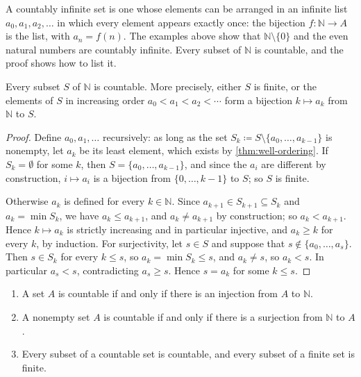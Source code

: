 A countably infinite set is one whose elements can be arranged in an infinite list $a_0,a_1,a_2,\ldots$ in which every element appears exactly once: the bijection $f\colon\mathbb N\to A$ is the list, with $a_n=f(n)$. The examples above show that $\mathbb N\setminus\{0\}$ and the even natural numbers are countably infinite. Every subset of $\mathbb N$ is countable, and the proof shows how to list it.

\begin{lemma}
\label{lem:subset-n}
Every subset $S$ of $\mathbb N$ is countable. More precisely, either $S$ is finite, or the elements of $S$ in increasing order $a_0<a_1<a_2<\cdots$ form a bijection $k\mapsto a_k$ from $\mathbb N$ to $S$.
\end{lemma}

\begin{proof}
Define $a_0,a_1,\ldots$ recursively: as long as the set $S_k\coloneqq S\setminus\{a_0,\ldots,a_{k-1}\}$ is nonempty, let $a_k$ be its least element, which exists by \cref{thm:well-ordering}. If $S_k=\emptyset$ for some $k$, then $S=\{a_0,\ldots,a_{k-1}\}$, and since the $a_i$ are different by construction, $i\mapsto a_i$ is a bijection from $\{0,\ldots,k-1\}$ to $S$; so $S$ is finite.

Otherwise $a_k$ is defined for every $k\in\mathbb N$. Since $a_{k+1}\in S_{k+1}\subseteq S_k$ and $a_k=\min S_k$, we have $a_k\le a_{k+1}$, and $a_k\ne a_{k+1}$ by construction; so $a_k<a_{k+1}$. Hence $k\mapsto a_k$ is strictly increasing and in particular injective, and $a_k\ge k$ for every $k$, by induction. For surjectivity, let $s\in S$ and suppose that $s\notin\{a_0,\ldots,a_s\}$. Then $s\in S_k$ for every $k\le s$, so $a_k=\min S_k\le s$, and $a_k\ne s$, so $a_k<s$. In particular $a_s<s$, contradicting $a_s\ge s$. Hence $s=a_k$ for some $k\le s$.
\end{proof}

\begin{corollary}
\label{cor:countable}
\leavevmode
\begin{enumerate}
\item A set $A$ is countable if and only if there is an injection from $A$ to $\mathbb N$.
\item A nonempty set $A$ is countable if and only if there is a surjection from $\mathbb N$ to $A$.
\item Every subset of a countable set is countable, and every subset of a finite set is finite.
\end{enumerate}
\end{corollary}

